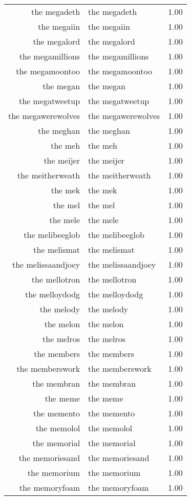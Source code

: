 \begin{table}[ht]
\begin{tabular}{rlr}
  the megadeth & the megadeth & 1.00 \\ 
  the megaiin & the megaiin & 1.00 \\ 
  the megalord & the megalord & 1.00 \\ 
  the megamillions & the megamillions & 1.00 \\ 
  the megamoontoo & the megamoontoo & 1.00 \\ 
  the megan & the megan & 1.00 \\ 
  the megatweetup & the megatweetup & 1.00 \\ 
  the megawerewolves & the megawerewolves & 1.00 \\ 
  the meghan & the meghan & 1.00 \\ 
  the meh & the meh & 1.00 \\ 
  the meijer & the meijer & 1.00 \\ 
  the meitherweath & the meitherweath & 1.00 \\ 
  the mek & the mek & 1.00 \\ 
  the mel & the mel & 1.00 \\ 
  the mele & the mele & 1.00 \\ 
  the melibeeglob & the melibeeglob & 1.00 \\ 
  the melismat & the melismat & 1.00 \\ 
  the melissaandjoey & the melissaandjoey & 1.00 \\ 
  the mellotron & the mellotron & 1.00 \\ 
  the melloydodg & the melloydodg & 1.00 \\ 
  the melody & the melody & 1.00 \\ 
  the melon & the melon & 1.00 \\ 
  the melros & the melros & 1.00 \\ 
  the members & the members & 1.00 \\ 
  the memberswork & the memberswork & 1.00 \\ 
  the membran & the membran & 1.00 \\ 
  the meme & the meme & 1.00 \\ 
  the memento & the memento & 1.00 \\ 
  the memolol & the memolol & 1.00 \\ 
  the memorial & the memorial & 1.00 \\ 
  the memoriesand & the memoriesand & 1.00 \\ 
  the memorium & the memorium & 1.00 \\ 
  the memoryfoam & the memoryfoam & 1.00 \\ 

\end{tabular}
\end{table}
